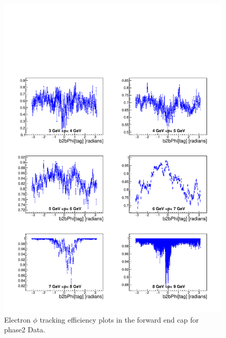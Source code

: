 \documentclass[a4paper,11pt,twosided,final,german,openbib,pdftex,listof=totoc,bibliography=totoc]{scrbook}
\begin{document}
\begin{appendix}
\begin{figure}[!htbp]
	\centering
	\includegraphics[width=\textwidth]{Plots/master/xPMPhiemFC_Data}
	\caption[Momentum $\phi$ Electron Forward End Cap Efficiency Phase2 Data]{Electron $\phi$ tracking efficiency plots in the forward end cap for phase2 Data.}
	\label{plt:PMPhiemFC_Data}
\end{figure}



\end{appendix}
\end{document}
